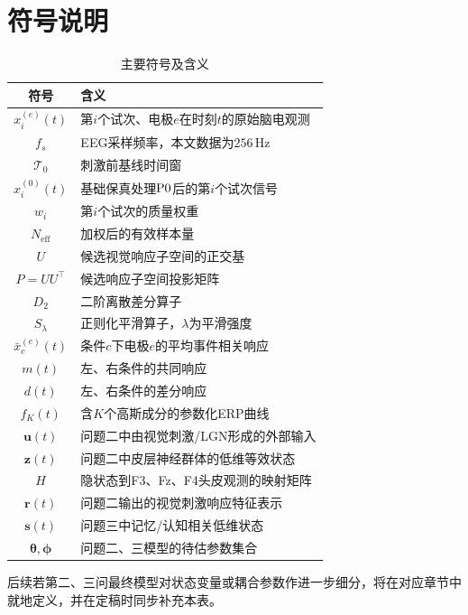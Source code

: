 \section{符号说明}

\begin{table}[H]
\centering
\caption{主要符号及含义}
\label{tab:symbols}
\begin{tabularx}{0.96\textwidth}{cX}
\toprule
符号 & 含义\\
\midrule
$x_i^{(e)}(t)$ & 第$i$个试次、电极$e$在时刻$t$的原始脑电观测\\
$f_s$ & EEG采样频率，本文数据为$256\,\mathrm{Hz}$\\
$\mathcal{T}_0$ & 刺激前基线时间窗\\
$x_i^{(0)}(t)$ & 基础保真处理$\mathrm{P0}$后的第$i$个试次信号\\
$w_i$ & 第$i$个试次的质量权重\\
$N_{\mathrm{eff}}$ & 加权后的有效样本量\\
$U$ & 候选视觉响应子空间的正交基\\
$P=UU^\top$ & 候选响应子空间投影矩阵\\
$D_2$ & 二阶离散差分算子\\
$S_\lambda$ & 正则化平滑算子，$\lambda$为平滑强度\\
$\bar{x}_{c}^{(e)}(t)$ & 条件$c$下电极$e$的平均事件相关响应\\
$m(t)$ & 左、右条件的共同响应\\
$d(t)$ & 左、右条件的差分响应\\
$f_K(t)$ & 含$K$个高斯成分的参数化ERP曲线\\
$\bm u(t)$ & 问题二中由视觉刺激/LGN形成的外部输入\\
$\bm z(t)$ & 问题二中皮层神经群体的低维等效状态\\
$H$ & 隐状态到F3、Fz、F4头皮观测的映射矩阵\\
$\bm r(t)$ & 问题二输出的视觉刺激响应特征表示\\
$\bm s(t)$ & 问题三中记忆/认知相关低维状态\\
$\bm\theta,\bm\phi$ & 问题二、三模型的待估参数集合\\
\bottomrule
\end{tabularx}
\end{table}

后续若第二、三问最终模型对状态变量或耦合参数作进一步细分，将在对应章节中就地定义，并在定稿时同步补充本表。
